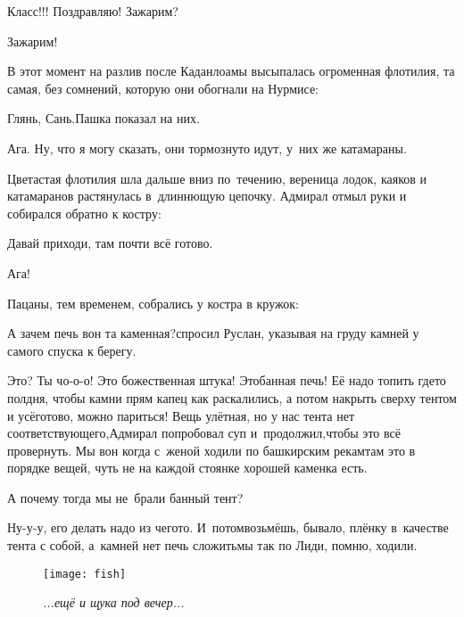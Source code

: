 \diagdash Класс!!! Поздравляю! Зажарим?

\diagdash Зажарим!

В этот момент на разлив после Каданлоамы высыпалась огроменная флотилия, та самая, без сомнений, которую они обогнали на Нурмисе:

\diagdash Глянь, Сань.\mdash Пашка показал на них.

\diagdash Ага. Ну, что я могу сказать, они тормознуто идут, у~них же катамараны.

Цветастая флотилия шла дальше вниз по~течению, вереница лодок, каяков и катамаранов растянулась в~длиннющую цепочку. Адмирал отмыл руки и собирался обратно к костру:

\diagdash Давай приходи, там почти всё готово.

\diagdash Ага!

Пацаны, тем временем, собрались у костра в кружок:

\diagdash А зачем печь вон та каменная?\mdash спросил Руслан, указывая на груду камней у самого спуска к берегу.

\diagdash Это? Ты чо-о-о! Это божественная штука! Это\mdash банная печь! Её надо топить где\sdash то полдня, чтобы камни прям капец как раскалились, а потом накрыть сверху тентом и усё\mdash готово, можно париться! Вещь улётная, но у нас тента нет соответствующего,\mdash Адмирал попробовал суп и~продолжил,\mdash чтобы это всё провернуть. Мы вон когда с~женой ходили по башкирским рекам\mdash там это в порядке вещей, чуть не на каждой стоянке хорошей каменка есть.

%
\diagdash А почему тогда мы не~брали банный тент?

\diagdash Ну-у-у, его делать надо из чего\sdash то. И~потом\mdash возьмёшь, бывало, плёнку в~качестве тента с собой, а~камней нет печь сложить\mdash мы так по Лиди, помню, ходили. 

\begin{figure}[h]
	\centering
	\texttt{[image: fish]}
	\caption{\small\textit{...ещё и щука под вечер...}}
\end{figure}


